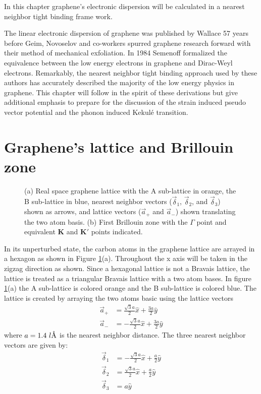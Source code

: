 In this chapter graphene's electronic dispersion will be calculated in a nearest neighbor tight binding frame work.

The linear electronic dispersion of graphene was published by Wallace\cite{Wallace1947} 57 years before Geim, Novoselov and co-workers spurred graphene research forward with their method of mechanical exfoliation\cite{Novoselov2004}.
In 1984 Semenoff formalized the equivalence between the low energy electrons in graphene and Dirac-Weyl electrons.
Remarkably, the nearest neighbor tight binding approach used by these authors has accurately described the majority of the low energy physics in graphene.
This chapter will follow in the spirit of these derivations but give additional emphasis to prepare for the discussion of the strain induced pseudo vector potential and the phonon induced Kekul\'e transition.

\section{Graphene's lattice and Brillouin zone}
\begin{figure}
	\begin{center}
	
	\end{center}
	\caption{\label{fig:TB:geometry} (a) Real space graphene lattice with the A sub-lattice in orange, the B sub-lattice in blue, nearest neighbor vectors ($\vec \delta_1$, $\vec \delta_2$, and $\vec \delta_3$) shown as arrows, and lattice vectors ($\vec a_+$ and $\vec a_-$) shown translating the two atom basis. (b) First Brillouin zone with the $\Gamma$ point and equivalent $\bm{K}$ and $\bm{K'}$ points indicated.}
\end{figure}

In its unperturbed state, the carbon atoms in the graphene lattice are arrayed in a hexagon as shown in Figure \ref{fig:TB:geometry}(a).
Throughout the x axis will be taken in the zigzag direction as shown.
Since a hexagonal lattice is not a Bravais lattice, the lattice is treated as a triangular Bravais lattice with a two atom bases.
In figure \ref{fig:TB:geometry}(a) the A sub-lattice is colored orange and the B sub-lattice is colored blue.
The lattice is created by arraying the two atoms basic using the lattice vectors 
\begin{align*}
	\vec{a}_+&= \frac{\sqrt{3}a}{2} \hat{x} + \frac{3a}{2} \hat{y} \\
	\vec{a}_-&=-\frac{\sqrt{3}a}{2} \hat{x} + \frac{3a}{2} \hat{y}
\end{align*}
where $a=1.4 \ l\textup{\AA}$ is the nearest neighbor distance.
The three nearest neighbor vectors are given by:
\begin{align*}
	\vec \delta_1&=-\frac{\sqrt{3} a}{2}\hat{x}+\frac{a}{2}\hat{y}\\
	\vec \delta_2&= \frac{\sqrt{3} a}{2}\hat{x}+\frac{a}{2}\hat{y}\\
	\vec \delta_3&=a \hat{y}
\end{align*}

